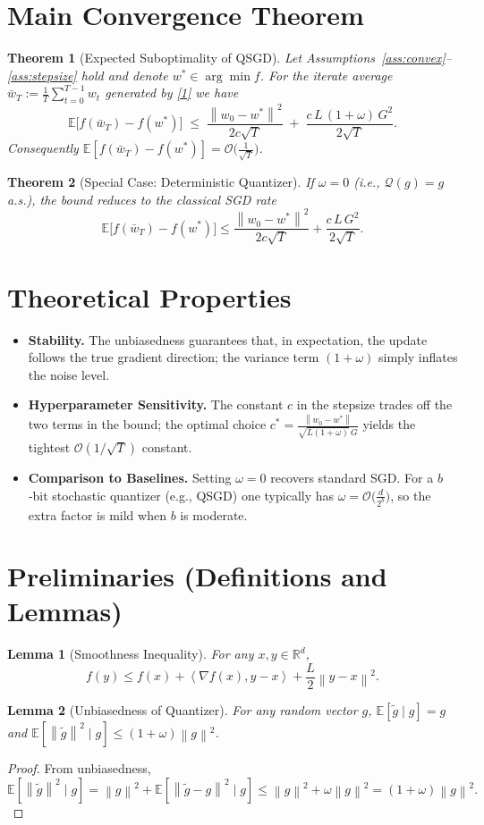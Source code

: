 \documentclass{article}
\newtheorem{theorem}{Theorem}
\newtheorem{lemma}{Lemma}
\newcommand{\E}{\mathbb{E}}
\newcommand{\R}{\mathbb{R}}
\newcommand{\norm}[1]{\left\|#1\right\|}
\newcommand{\ip}[2]{\left\langle #1,#2\right\rangle}
\newcommand{\Q}{\mathcal{Q}}
\begin{document}
\section*{Main Convergence Theorem}
\begin{theorem}[Expected Suboptimality of QSGD]\label{thm:main}
Let Assumptions~\ref{ass:convex}–\ref{ass:stepsize} hold and denote $w^{*}\in\arg\min f$.  
For the iterate average $\bar w_{T}:=\frac1T\sum_{t=0}^{T-1}w_{t}$ generated by \eqref{1} we have
\[
\E\!\big[f(\bar w_{T})-f(w^{*})\big]\;\le\;
\frac{\norm{w_{0}-w^{*}}^{2}}{2c\sqrt{T}}
\;+\;
\frac{c\,L\,(1+\omega)\,G^{2}}{2\sqrt{T}}.
\]
Consequently $\E[f(\bar w_{T})-f(w^{*})]=\mathcal{O}\!\big(\tfrac{1}{\sqrt{T}}\big)$.
\end{theorem}
\begin{theorem}[Special Case: Deterministic Quantizer]\label{thm:det}
If $\omega=0$ (i.e., $\Q(g)=g$ a.s.), the bound reduces to the classical SGD rate
\[
\E\!\big[f(\bar w_{T})-f(w^{*})\big]\le
\frac{\norm{w_{0}-w^{*}}^{2}}{2c\sqrt{T}}
+\frac{c\,L\,G^{2}}{2\sqrt{T}}.
\]
\end{theorem}

\section*{Theoretical Properties}
\begin{itemize}
\item \textbf{Stability.} The unbiasedness guarantees that, in expectation, the update follows the true gradient direction; the variance term $(1+\omega)$ simply inflates the noise level.
\item \textbf{Hyperparameter Sensitivity.} The constant $c$ in the stepsize trades off the two terms in the bound; the optimal choice $c^{*}= \frac{\norm{w_{0}-w^{*}}}{\sqrt{L(1+\omega)}\,G}$ yields the tightest $\mathcal{O}(1/\sqrt{T})$ constant.
\item \textbf{Comparison to Baselines.} Setting $\omega=0$ recovers standard SGD. For a $b$‑bit stochastic quantizer (e.g., QSGD) one typically has $\omega = \mathcal{O}\!\big(\frac{d}{2^{b}}\big)$, so the extra factor is mild when $b$ is moderate.
\end{itemize}

\section*{Preliminaries (Definitions and Lemmas)}
\begin{lemma}[Smoothness Inequality]\label{lem:smooth}
For any $x,y\in\R^{d}$,
\[
f(y)\le f(x)+\ip{\nabla f(x)}{y-x}+\frac{L}{2}\norm{y-x}^{2}.
\]
\end{lemma}
\begin{lemma}[Unbiasedness of Quantizer]\label{lem:unbiased}
For any random vector $g$, $\E[\tilde g\mid g]=g$ and $\E[\norm{\tilde g}^{2}\mid g]\le (1+\omega)\norm{g}^{2}$.
\end{lemma}
\begin{proof}
From unbiasedness,
\[
\E[\norm{\tilde g}^{2}\mid g]
 =\norm{g}^{2}+ \E[\norm{\tilde g-g}^{2}\mid g]
 \le \norm{g}^{2}+ \omega\norm{g}^{2}
 =(1+\omega)\norm{g}^{2}.
\]
\end{proof}
\end{document}
